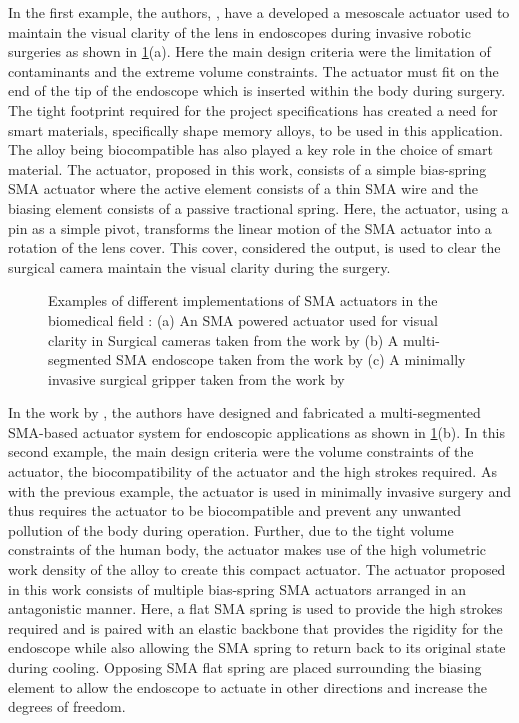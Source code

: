 In the first example, the authors, \cite{liuMesoscaleShapeMemory2019}, have a developed a mesoscale actuator used to maintain the visual clarity of the lens in endoscopes during invasive robotic surgeries as shown in \cref{fig:biomed-examples}(a). Here the main design criteria were the limitation of contaminants and the extreme volume constraints. The actuator must fit on the end of the tip of the endoscope which is inserted within the body during surgery. The tight footprint required for the project specifications has created a need for smart materials, specifically shape memory alloys, to be used in this application. The alloy being biocompatible has also played a key role in the choice of smart material. The actuator, proposed in this work, consists of a simple bias-spring SMA actuator where the active element consists of a thin SMA wire and the biasing element consists of a passive tractional spring. Here, the actuator, using a pin as a simple pivot, transforms the linear motion of the SMA actuator into a rotation of the lens cover. This cover, considered the output, is used to clear the surgical camera maintain the visual clarity during the surgery.
\begin{figure}[hbt!]
    \centering
    
    \caption{Examples of different implementations of SMA actuators in the biomedical field : (a) An SMA powered actuator used for visual clarity in Surgical cameras taken from the work by \cite{liuMesoscaleShapeMemory2019} (b) A multi-segmented SMA endoscope taken from the work by \cite{abdulkadirMultisegmentedShapeMemory2019b} (c) A minimally invasive surgical gripper taken from the work by \cite{roshanDesignFabricationMinimally2018}}
    \label{fig:biomed-examples}
\end{figure}

In the work by \cite{abdulkadirMultisegmentedShapeMemory2019b}, the authors have designed and fabricated a multi-segmented SMA-based actuator system for endoscopic applications as shown in \cref{fig:biomed-examples}(b). In this second example, the main design criteria were the volume constraints of the actuator, the biocompatibility of the actuator and the high strokes required. As with the previous example, the actuator is used in minimally invasive surgery and thus requires the actuator to be biocompatible and prevent any unwanted pollution of the body during operation. Further, due to the tight volume constraints of the human body, the actuator makes use of the high volumetric work density of the alloy to create this compact actuator. The actuator proposed in this work consists of multiple bias-spring SMA actuators arranged in an antagonistic manner. Here, a flat SMA spring is used to provide the high strokes required and is paired with an elastic backbone that provides the rigidity for the endoscope while also allowing the SMA spring to return back to its original state during cooling. Opposing SMA flat spring are placed surrounding the biasing element to allow the endoscope to actuate in other directions and increase the degrees of freedom.

